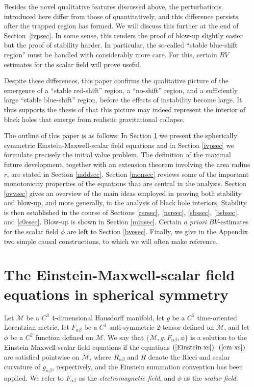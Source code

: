 \documentclass{article}
\begin{document}
Besides the novel qualitative features discussed above, the
perturbations introduced here differ from those of \cite{md:si}
quantitatively, and this difference persists after the trapped
region has formed. We will discuss this further at the end of
Section~\ref{ivpsec}. In some sense, this renders the proof of
blow-up slightly easier but the proof of stability harder.
In particular, the so-called ``stable blue-shift region'' 
must be handled with considerably
more care. For this, certain $BV$ estimates for the scalar field will
prove useful.

Despite these differences, this paper confirms the qualitative
picture of the emergence of a ``stable red-shift'' region,
a ``no-shift'' region, and a sufficiently large ``stable blue-shift''
region, before the effects of instability become large. It thus supports
the thesis of \cite{md:si} 
that this picture may indeed represent
the interior of black holes that emerge from realistic gravitational
collapse.

The outline of this paper is as follows:
In Section \ref{sphsymsec} we present the spherically symmetric
Einstein-Maxwell-scalar field equations and in Section \ref{ivpsec} we
formulate precisely the initial value problem.
The definition of the maximal future development, 
together with an extension theorem involving the
area radius $r$, are stated in Section \ref{mddsec}. 
Section \ref{monsec} reviews some of the important monotonicity
properties of the equations that are central in the analysis. 
Section \ref{ovvsec} gives an overview of the main ideas employed in proving
both stability and blow-up, and more 
generally, in the analysis
of black hole interiors. Stability is then established
in the course of Sections \ref{rsrsec}, \ref{nsrsec}, \ref{sbssec}, \ref{bsbsec}, 
and \ref{c0esec}.
Blow-up is shown in Section \ref{minsec}.
Certain \emph{a priori} $BV$-estimates for the
scalar field $\phi$ are left to Section \ref{bvesec}. 
Finally, we give in the Appendix two simple causal constructions,
to which we will often make reference.



\section{The Einstein-Maxwell-scalar field equations in spherical
symmetry}
\label{sphsymsec}


Let $\mathcal{M}$ be a $C^3$ $4$-dimensional 
Hausdorff manifold, let $g$ be a $C^2$
time-oriented Lorentzian metric, let $F_{\alpha\beta}$ be
a $C^1$ anti-symmetric $2$-tensor defined on $\mathcal{M}$, and let $\phi$
be a $C^2$ function defined on $\mathcal{M}$. We say that
$\{\mathcal{M},g,F_{\alpha\beta},\phi\}$ is a solution to the
Einstein-Maxwell-scalar field equations if the equations
$(\ref{Einstein-xs})$--$(\ref{em-xs})$
are satisfied
pointwise
on $\mathcal{M}$,
where $R_{\alpha\beta}$ and $R$ denote the Ricci and scalar
curvature of $g_{\alpha\beta}$, respectively, and the Einstein summation 
convention has been applied. We refer to $F_{\alpha\beta}$ as the \emph{electromagnetic
field}, and $\phi$ as the \emph{scalar field}.
\end{document}

